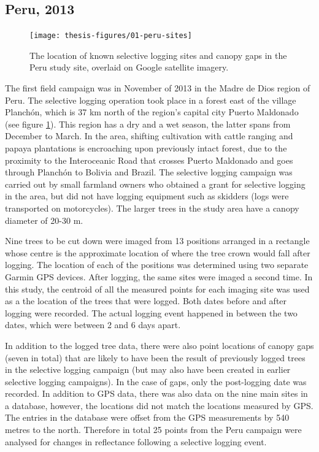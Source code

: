 \documentclass[a4paper,12pt]{scrbook}
\begin{document}
\subsection{Peru, 2013}

\begin{figure}
    \centering
    \texttt{[image: thesis-figures/01-peru-sites]}
    \caption{The location of known selective logging sites and canopy gaps in the Peru study site, overlaid on Google satellite imagery.}
    \label{fig-peru}
\end{figure}

The first field campaign was in November of 2013 in the Madre de Dios region of Peru. The selective logging operation took place in a forest east of the village Planchón, which is 37 km north of the region's capital city Puerto Maldonado (see figure \ref{fig-peru}). This region has a dry and a wet season, the latter spans from December to March. In the area, shifting cultivation with cattle ranging and papaya plantations is encroaching upon previously intact forest, due to the proximity to the Interoceanic Road that crosses Puerto Maldonado and goes through Planchón to Bolivia and Brazil. The selective logging campaign was carried out by small farmland owners who obtained a grant for selective logging in the area, but did not have logging equipment such as skidders (logs were transported on motorcycles). The larger trees in the study area have a canopy diameter of 20-30 m.

Nine trees to be cut down were imaged from 13 positions arranged in a rectangle whose centre is the approximate location of where the tree crown would fall after logging. The location of each of the positions was determined using two separate Garmin \ac{GPS} devices. After logging, the same sites were imaged a second time. In this study, the centroid of all the measured points for each imaging site was used as a the location of the trees that were logged. Both dates before and after logging were recorded. The actual logging event happened in between the two dates, which were between 2 and 6 days apart.

In addition to the logged tree data, there were also point locations of canopy gaps (seven in total) that are likely to have been the result of previously logged trees in the selective logging campaign (but may also have been created in earlier selective logging campaigns). In the case of gaps, only the post-logging date was recorded. In addition to \ac{GPS} data, there was also data on the nine main sites in a database, however, the locations did not match the locations measured by GPS. The entries in the database were offset from the GPS measurements by 540 metres to the north. Therefore in total 25 points from the Peru campaign were analysed for changes in reflectance following a selective logging event.
\end{document}
